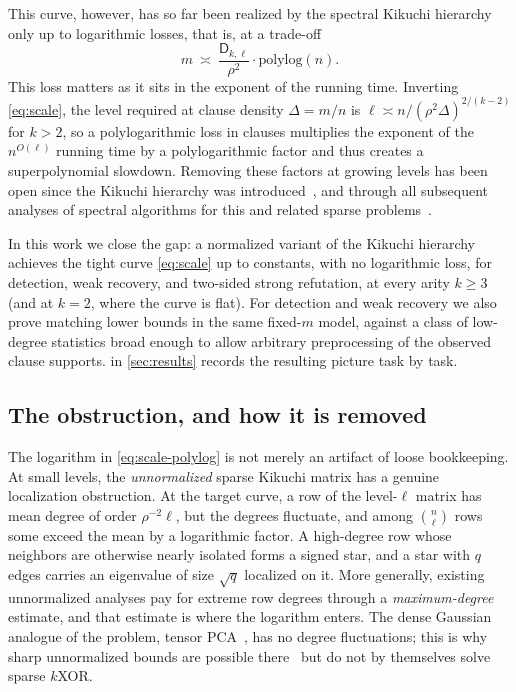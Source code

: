 \documentclass[11pt]{article}
\theoremstyle{definition}
\theoremstyle{remark}
\newcommand{\1}{\mathbf 1}
\newcommand{\Dkl}{\mathsf D_{k,\ell}}
\numberwithin{equation}{section}
\begin{document}
This curve, however, has so far been realized by the spectral Kikuchi
hierarchy only up to logarithmic
losses, that is, at a trade-off
\begin{equation}\label{eq:scale-polylog}
 m\ \asymp\ \frac{\Dkl}{\rho^2}\cdot\mathrm{polylog}(n).
\end{equation}
This loss matters as it sits in the
exponent of the running time.  Inverting \cref{eq:scale}, the level
required at clause density $\Delta=m/n$ is
$\ell\asymp n/(\rho^2\Delta)^{2/(k-2)}$ for $k>2$, so a polylogarithmic
loss in clauses multiplies the exponent of the $n^{O(\ell)}$ running time
by a polylogarithmic factor and thus creates a superpolynomial
slowdown.  Removing these factors at growing levels has been open since the Kikuchi
hierarchy was introduced~\cite{WEM}, and through all subsequent analyses
of spectral algorithms for this and related sparse problems~\cite{GKM,HKM,HKMMS,SOKB,SZ}.  %

In this work we close the gap: a normalized variant of the Kikuchi hierarchy achieves the tight
curve \cref{eq:scale} up to constants, with no logarithmic loss, for
detection, weak recovery, and two-sided strong refutation, at every
arity $k\ge3$ (and at $k=2$, where the curve is flat).  For detection
and weak recovery we also prove matching lower bounds in the same
fixed-$m$ model, against a class of low-degree statistics broad
enough to allow arbitrary preprocessing of the observed clause
supports.   in \cref{sec:results} records the
resulting picture task by task.

\subsection{The obstruction, and how it is removed}\label{sec:obstruction}

The logarithm in \cref{eq:scale-polylog} is not merely an artifact of loose
bookkeeping.  At small levels, the \emph{unnormalized} sparse Kikuchi
matrix has a genuine localization obstruction.  At the target curve, a
row of the level-$\ell$ matrix has mean degree of order
$\rho^{-2}\ell$, but the degrees fluctuate, and among $\binom n\ell$
rows some exceed the mean by a logarithmic factor.  A high-degree row
whose neighbors are otherwise nearly isolated forms a signed star, and
a star with $q$ edges carries an eigenvalue of size $\sqrt q$ localized
on it.  More generally, existing unnormalized
analyses pay for extreme row degrees through a \emph{maximum-degree}
estimate, and that estimate is where the logarithm enters. %
The dense Gaussian analogue of the problem, tensor PCA~\cite{RichardMontanari}, has no
degree fluctuations; this is why sharp unnormalized bounds are
possible there~\cite{KX} but do not by themselves solve sparse $k$XOR.
\end{document}
